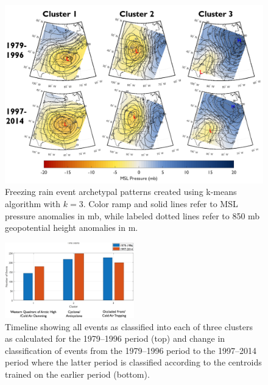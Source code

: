 \documentclass[twocol]{ametsoc}
\begin{document}
\begin{figure}

\centering

\includegraphics[width=\textwidth]{Clusters.PNG}

\caption{\label{fig:clusters} Freezing rain event archetypal patterns created using k-means algorithm with $k=3$. Color ramp and solid lines refer to MSL pressure anomalies in mb, while labeled dotted lines refer to 850 mb geopotential height anomalies in m.}

\end{figure}



\begin{figure}

\centering

\includegraphics[width=0.5\textwidth]{Storm_Pattern_Change.png}

\caption{\label{fig:clusterchange} Timeline showing all events as classified into each of three clusters as calculated for the 1979--1996 period (top) and change in classification of events from the 1979--1996 period to the 1997--2014 period where the latter period is classified according to the centroids trained on the earlier period (bottom).}

\end{figure}
\end{document}
